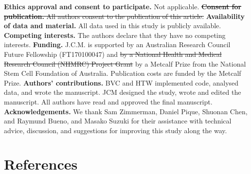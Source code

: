 \documentclass[11pt]{article}
\newcommand{\sr}[1]{{\color{red} \st{#1} }}
\newcommand{\rd}[1]{{\color{red}#1}}
\begin{document}
\textbf{Ethics approval and consent to participate.} Not applicable.
\newline
\newline
\sr{\textbf{Consent for publication.} All authors consent to the publication of this article.}
\newline
\newline
\textbf{Availability of data and material.} All data used in this study is publicly available. 
\newline
\newline
\textbf{Competing interests.} The authors declare that they have no competing interests.
\newline
\newline
\textbf{Funding.} J.C.M. is supported by an Australian Research Council Future Fellowship \rd{(FT170100047)} and \sr{by a National Health and Medical Research Council (NHMRC) Project Grant} \rd{by a Metcalf Prize from the National Stem Cell Foundation of Australia. Publication costs are funded by the Metcalf Prize.} 
\newline
\newline
\textbf{Authors' contributions.} BVC and HTW implemented code, analysed data, and wrote the manuscript. JCM designed the study, wrote and edited the manuscript. \rd{All authors have read and approved the final manuscript.} 
\newline
\newline
\textbf{Acknowledgements.} We thank Sam Zimmerman, Daniel Pique, Shuonan Chen, and Raymund Bueno, and Masako Suzuki for their assistance with technical advice, discussion, and suggestions for improving this study along the way. 

\section*{References}

\renewcommand{\bf}[1]{\textbf{#1}}
\end{document}
